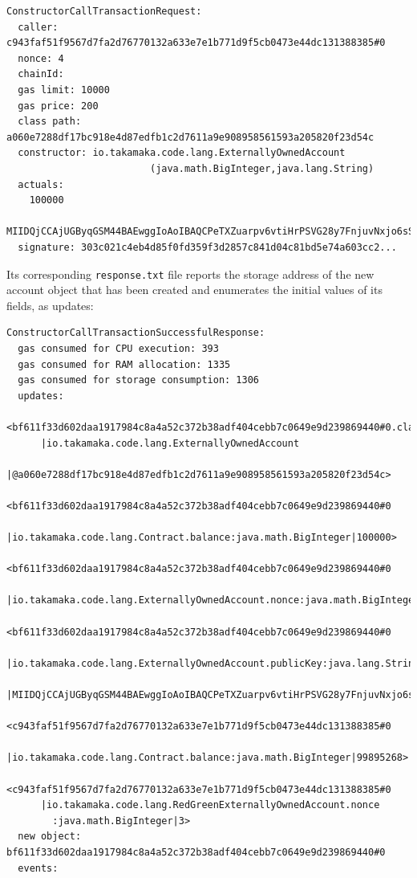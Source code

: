 \documentclass[a4paper,]{book}
\begin{document}
{\begin{myverbatim}
\begin{verbatim}
ConstructorCallTransactionRequest:
  caller: c943faf51f9567d7fa2d76770132a633e7e1b771d9f5cb0473e44dc131388385#0
  nonce: 4
  chainId:
  gas limit: 10000
  gas price: 200
  class path: a060e7288df17bc918e4d87edfb1c2d7611a9e908958561593a205820f23d54c
  constructor: io.takamaka.code.lang.ExternallyOwnedAccount
                         (java.math.BigInteger,java.lang.String)
  actuals:
    100000
    MIIDQjCCAjUGByqGSM44BAEwggIoAoIBAQCPeTXZuarpv6vtiHrPSVG28y7FnjuvNxjo6sSWHz79N...
  signature: 303c021c4eb4d85f0fd359f3d2857c841d04c81bd5e74a603cc2...
\end{verbatim}
\end{myverbatim}

Its corresponding \texttt{response.txt} file reports the storage address
of the new account object that has been created and enumerates the
initial values of its fields, as updates:

\begin{myverbatim}
\begin{verbatim}
ConstructorCallTransactionSuccessfulResponse:
  gas consumed for CPU execution: 393
  gas consumed for RAM allocation: 1335
  gas consumed for storage consumption: 1306
  updates:
    <bf611f33d602daa1917984c8a4a52c372b38adf404cebb7c0649e9d239869440#0.class
      |io.takamaka.code.lang.ExternallyOwnedAccount
      |@a060e7288df17bc918e4d87edfb1c2d7611a9e908958561593a205820f23d54c>
    <bf611f33d602daa1917984c8a4a52c372b38adf404cebb7c0649e9d239869440#0
      |io.takamaka.code.lang.Contract.balance:java.math.BigInteger|100000>
    <bf611f33d602daa1917984c8a4a52c372b38adf404cebb7c0649e9d239869440#0
      |io.takamaka.code.lang.ExternallyOwnedAccount.nonce:java.math.BigInteger|0>
    <bf611f33d602daa1917984c8a4a52c372b38adf404cebb7c0649e9d239869440#0
      |io.takamaka.code.lang.ExternallyOwnedAccount.publicKey:java.lang.String
      |MIIDQjCCAjUGByqGSM44BAEwggIoAoIBAQCPeTXZuarpv6vtiHrPSVG28y7FnjuvNxjo6sSWH...>
    <c943faf51f9567d7fa2d76770132a633e7e1b771d9f5cb0473e44dc131388385#0
      |io.takamaka.code.lang.Contract.balance:java.math.BigInteger|99895268>
    <c943faf51f9567d7fa2d76770132a633e7e1b771d9f5cb0473e44dc131388385#0
      |io.takamaka.code.lang.RedGreenExternallyOwnedAccount.nonce
        :java.math.BigInteger|3>
  new object: bf611f33d602daa1917984c8a4a52c372b38adf404cebb7c0649e9d239869440#0
  events:
\end{verbatim}
\end{myverbatim}

}
\end{document}
